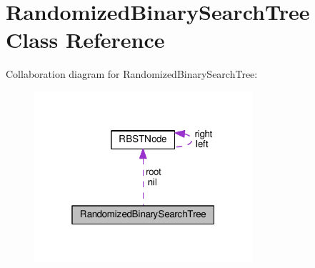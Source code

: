\hypertarget{classRandomizedBinarySearchTree}{}\section{Randomized\+Binary\+Search\+Tree Class Reference}
\label{classRandomizedBinarySearchTree}


Collaboration diagram for Randomized\+Binary\+Search\+Tree\+:
\nopagebreak
\begin{figure}[H]
\begin{center}
\leavevmode
\includegraphics[width=229pt]{classRandomizedBinarySearchTree__coll__graph}
\end{center}
\end{figure}
